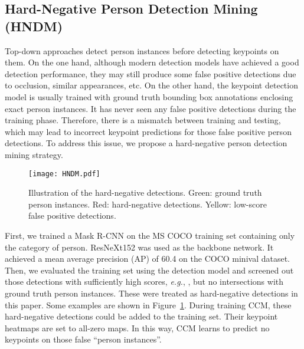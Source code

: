 \documentclass[twocolumn]{svjour3}          \smartqed  \usepackage{natbib}
\begin{document}
\subsection{Hard-Negative Person Detection Mining (HNDM)}
\label{subsec:hndm}
Top-down approaches detect person instances before detecting keypoints on them. On the one hand, although modern detection models have achieved a good detection performance, they may still produce some false positive detections due to occlusion, similar appearances, etc. On the other hand, the keypoint detection model is usually trained with ground truth bounding box annotations enclosing exact person instances. It has never seen any false positive detections during the training phase. Therefore, there is a mismatch between training and testing, which may lead to incorrect keypoint predictions for those false positive person detections. To address this issue, we propose a hard-negative person detection mining strategy.

\begin{figure}[t]
\begin{center}
   \texttt{[image: HNDM.pdf]}
\end{center}
   \caption{Illustration of the hard-negative detections. Green: ground truth person instances. Red: hard-negative detections. Yellow: low-score false positive detections.}
\label{fig:hndm}
\end{figure}

First, we trained a Mask R-CNN on the MS COCO training set containing only the category of person. ResNeXt152 was used as the backbone network. It achieved a mean average precision (AP) of 60.4 on the COCO minival dataset. Then, we evaluated the training set using the detection model and screened out those detections with sufficiently high scores, \emph{e.g.}, , but no intersections with ground truth person instances. These were treated as hard-negative detections in this paper. Some examples are shown in Figure~\ref{fig:hndm}. During training CCM, these hard-negative detections could be added to the training set. Their keypoint heatmaps are set to all-zero maps. In this way, CCM learns to predict no keypoints on those false ``person instances''.
\end{document}
